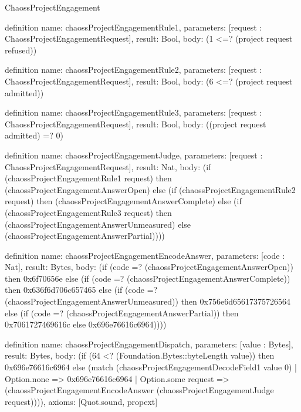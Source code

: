 \begin{lexlean}{ChaossProjectEngagement}
\begin{semanticmodule}
definition{
  name: chaossProjectEngagementRule1,
  parameters: [request : ChaossProjectEngagementRequest],
  result: Bool,
  body: (1 <=? (project request refused))
}

definition{
  name: chaossProjectEngagementRule2,
  parameters: [request : ChaossProjectEngagementRequest],
  result: Bool,
  body: (6 <=? (project request admitted))
}

definition{
  name: chaossProjectEngagementRule3,
  parameters: [request : ChaossProjectEngagementRequest],
  result: Bool,
  body: ((project request admitted) =? 0)
}

definition{
  name: chaossProjectEngagementJudge,
  parameters: [request : ChaossProjectEngagementRequest],
  result: Nat,
  body: (if (chaossProjectEngagementRule1 request) then (chaossProjectEngagementAnswerOpen) else (if (chaossProjectEngagementRule2 request) then (chaossProjectEngagementAnswerComplete) else (if (chaossProjectEngagementRule3 request) then (chaossProjectEngagementAnswerUnmeasured) else (chaossProjectEngagementAnswerPartial))))
}

definition{
  name: chaossProjectEngagementEncodeAnswer,
  parameters: [code : Nat],
  result: Bytes,
  body: (if (code =? (chaossProjectEngagementAnswerOpen)) then 0x6f70656e else (if (code =? (chaossProjectEngagementAnswerComplete)) then 0x636f6d706c657465 else (if (code =? (chaossProjectEngagementAnswerUnmeasured)) then 0x756e6d65617375726564 else (if (code =? (chaossProjectEngagementAnswerPartial)) then 0x7061727469616c else 0x696e76616c6964))))
}

definition{
  name: chaossProjectEngagementDispatch,
  parameters: [value : Bytes],
  result: Bytes,
  body: (if (64 <? (Foundation.Bytes::byteLength value)) then 0x696e76616c6964 else (match (chaossProjectEngagementDecodeField1 value 0)
    | Option.none => 0x696e76616c6964
    | Option.some request => (chaossProjectEngagementEncodeAnswer (chaossProjectEngagementJudge request)))),
  axioms: [Quot.sound, propext]
}
\end{semanticmodule}
\end{lexlean}
